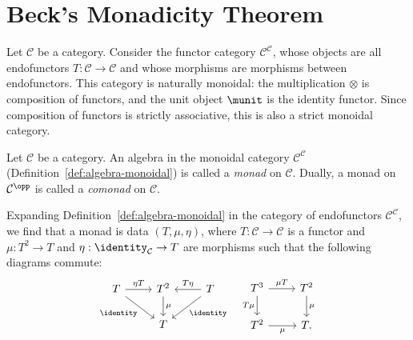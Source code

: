 
\section{Beck's Monadicity Theorem}\label{sec:Beck}
\hypertarget{o014.aljabr2.chapter7.beck-monadicity-a}{ }
Let $\mathcal{C}$ be a category. Consider the functor category
$\mathcal{C}^{\mathcal{C}}$, whose objects are all endofunctors
$T:\mathcal{C}\to\mathcal{C}$ and whose morphisms are morphisms between
endofunctors. This category is naturally monoidal: the multiplication
$\otimes$ is composition of functors, and the unit object $\munit$ is the
identity functor. Since composition of functors is strictly associative, this
is also a strict monoidal category.

\begin{definition}\label{def:monad}
	Let $\mathcal{C}$ be a category. An algebra in the monoidal category
	$\mathcal{C}^{\mathcal{C}}$ (Definition~\ref{def:algebra-monoidal}) is
	called a \emph{monad} on $\mathcal{C}$. Dually, a monad on
	$\mathcal{C}^{\opp}$ is called a \emph{comonad} on $\mathcal{C}$.
\end{definition}

Expanding Definition~\ref{def:algebra-monoidal} in the category of
endofunctors $\mathcal{C}^{\mathcal{C}}$, we find that a monad is data
$(T,\mu,\eta)$, where $T:\mathcal{C}\to\mathcal{C}$ is a functor and
$\mu:T^2\to T$ and $\eta:\identity_{\mathcal{C}}\to T$ are morphisms such
that the following diagrams commute:
\begin{equation*}\begin{gathered}
	\begin{tikzcd}
		T \arrow[r, "{\eta T}"] \arrow[rd, "\identity"'] & T^2 \arrow[d, "\mu"] & T \arrow[l, "{T\eta}"'] \arrow[ld, "\identity"] \\
		& T &
	\end{tikzcd} \quad
	\begin{tikzcd}
		T^3 \arrow[r, "\mu T"] \arrow[d, "T\mu"'] & T^2 \arrow[d, "\mu"] \\
		T^2 \arrow[r, "\mu"'] & T.
	\end{tikzcd}
\end{gathered}\end{equation*}

